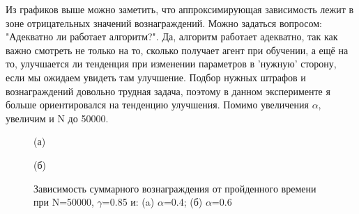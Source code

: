\documentclass[a4paper]{report}
\theoremstyle{definition}
\theoremstyle{plain}
\theoremstyle{remark}
\theoremstyle{remark}
\theoremstyle{definition}
\begin{document}
Из графиков выше можно заметить, что аппроксимирующая зависимость лежит в зоне отрицательных значений вознаграждений. Можно задаться вопросом: "Адекватно ли работает алгоритм?". Да, алгоритм работает адекватно, так как важно смотреть не только на то, сколько получает агент при обучении, а ещё на то, улучшается ли тенденция при изменении параметров в 'нужную' сторону, если мы ожидаем увидеть там улучшение. Подбор нужных штрафов и вознаграждений довольно трудная задача, поэтому в данном эксперименте я больше ориентировался на тенденцию улучшения. Помимо увеличения $\alpha$, увеличим и N до 50000.
\begin{figure}[H]
    \begin{minipage}[H]{0.49\linewidth}
        (а)\\
    \end{minipage}
    \hfill
    \begin{minipage}[H]{0.49\linewidth}
        (б)\\
    \end{minipage}
      \caption{Зависимость суммарного вознаграждения от пройденного времени при N=50000, $\gamma$=0.85 и: (a) $\alpha$=0.4; (б) $\alpha$=0.6}
\end{figure}
\end{document}
